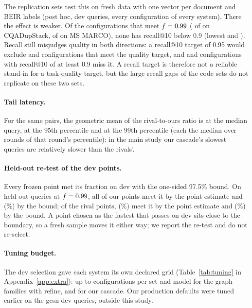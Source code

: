 The replication sets test this on fresh data with one vector per document and BEIR labels (post hoc, dev queries, every
configuration of every system). There the effect is weaker. Of the configurations that meet $f = 0.99$
( of  on CQADupStack,  of  on MS MARCO), none has
recall@10 below 0.9 (lowest  and ). Recall still misjudges quality in both directions: a
recall@10 target of 0.95 would exclude  and  configurations that meet the quality
target, and  and  configurations with recall@10 of at least 0.9 miss it. A recall target
is therefore not a reliable stand-in for a task-quality target, but the large recall gaps of the code sets do not
replicate on these two sets.

\paragraph{Tail latency.} For the same  pairs, the geometric mean of the rival-to-ours ratio is
 at the median query,  at the 95th percentile and  at the 99th percentile (each
the median over rounds of that round's percentile): in the main study our cascade's slowest queries are relatively
slower than the rivals'.

\paragraph{Held-out re-test of the dev points.} Every frozen point met its fraction on dev with the
one-sided 97.5\% bound. On held-out queries at $f = 0.99$, all  of our points meet it by
the point estimate and  (\%) by the bound; of the
 rival points,  (\%) meet it by the point estimate
and  (\%) by the bound. A point chosen as the fastest that passes
on dev sits close to the boundary, so a fresh sample moves it either way; we report the re-test and do
not re-select.

\paragraph{Tuning budget.} The dev selection gave each system its own declared grid
(Table~\ref{tab:tuning} in Appendix~\ref{app:extra}): up to  configurations per set and model for the graph families
with refine, and  for our cascade. Our production defaults were tuned earlier on the gcsn
dev queries, outside this study.



